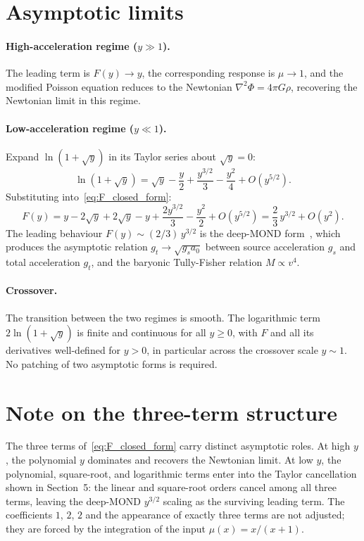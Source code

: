 \documentclass[11pt]{article}
\begin{document}
\section{Asymptotic limits}

\paragraph{High-acceleration regime ($y \gg 1$).}
The leading term is $F(y) \to y$, the corresponding response is
$\mu \to 1$, and the modified Poisson equation reduces to the
Newtonian $\nabla^2\Phi = 4\pi G\rho$, recovering the Newtonian
limit in this regime.

\paragraph{Low-acceleration regime ($y \ll 1$).}
Expand $\ln(1 + \sqrt{y})$ in its Taylor series about $\sqrt{y} = 0$:
\begin{equation}
  \ln(1 + \sqrt{y}) = \sqrt{y} - \frac{y}{2}
                    + \frac{y^{3/2}}{3} - \frac{y^2}{4} + O(y^{5/2}).
\end{equation}
Substituting into~\eqref{eq:F_closed_form}:
\begin{equation}
  F(y) = y - 2\sqrt{y} + 2\sqrt{y} - y + \frac{2 y^{3/2}}{3}
       - \frac{y^2}{2} + O(y^{5/2})
       = \frac{2}{3}\, y^{3/2} + O(y^2).
\end{equation}
The leading behaviour $F(y) \sim (2/3)\, y^{3/2}$ is the deep-MOND
form~\cite{BekensteinMilgrom1984}, which produces the asymptotic
relation $g_t \to \sqrt{g_s a_0}$ between source acceleration $g_s$
and total acceleration $g_t$, and the baryonic Tully-Fisher relation
$M \propto v^4$.

\paragraph{Crossover.}
The transition between the two regimes is smooth. The logarithmic
term $2\ln(1 + \sqrt{y})$ is finite and continuous for all
$y \geq 0$, with $F$ and all its derivatives well-defined for
$y > 0$, in particular across the crossover scale $y \sim 1$. No
patching of two asymptotic forms is required.

\section{Note on the three-term structure}

The three terms of~\eqref{eq:F_closed_form} carry distinct
asymptotic roles. At high $y$, the polynomial $y$ dominates and
recovers the Newtonian limit. At low $y$, the polynomial,
square-root, and logarithmic terms enter into the Taylor
cancellation shown in Section~5: the linear and square-root orders
cancel among all three terms, leaving the deep-MOND $y^{3/2}$
scaling as the surviving leading term. The coefficients $1$, $2$,
$2$ and the appearance of exactly three terms are not adjusted;
they are forced by the integration of the input
$\mu(x) = x/(x+1)$.
\end{document}
